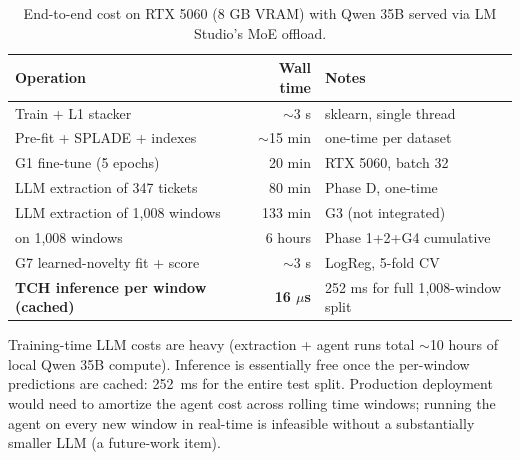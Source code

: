 \begin{table}[h]
\centering
\caption{End-to-end cost on RTX 5060 (8 GB VRAM) with Qwen 35B served via LM Studio's MoE offload.}
\label{tab:cost}
\small
\begin{tabularx}{\linewidth}{l r X}
\toprule
Operation & Wall time & Notes \\
\midrule
Train \hgb{} + L1 stacker         & $\sim$3 s & sklearn, single thread \\
Pre-fit \bienc{} + SPLADE + indexes & $\sim$15 min & one-time per dataset \\
G1 \bienc{} fine-tune (5 epochs)  & 20 min & RTX 5060, batch 32 \\
LLM extraction of 347 tickets     & 80 min & Phase D, one-time \\
LLM extraction of 1{,}008 windows & 133 min & G3 (not integrated) \\
\agent{} on 1{,}008 windows       & 6 hours & Phase 1+2+G4 cumulative \\
G7 learned-novelty fit + score    & $\sim$3 s & LogReg, 5-fold CV \\
\midrule
\textbf{TCH inference per window (cached)} & \textbf{16 $\mu$s} & 252 ms for full 1{,}008-window split \\
\bottomrule
\end{tabularx}
\end{table}

Training-time LLM costs are heavy (extraction + agent runs total $\sim$10 hours of local Qwen 35B compute). Inference is essentially free once the per-window predictions are cached: 252~ms for the entire test split. Production deployment would need to amortize the agent cost across rolling time windows; running the agent on every new window in real-time is infeasible without a substantially smaller LLM (a future-work item).
